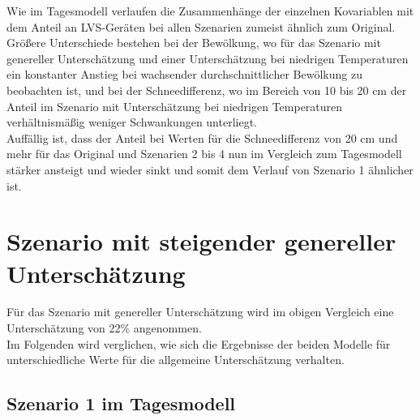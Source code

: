 \documentclass[12pt]{scrreprt}
\begin{document}
Wie im Tagesmodell verlaufen die Zusammenhänge der einzelnen Kovariablen mit dem Anteil an LVS-Geräten bei allen Szenarien zumeist ähnlich zum Original. Größere Unterschiede bestehen bei der Bewölkung, wo für das Szenario mit genereller Unterschätzung und einer Unterschätzung bei niedrigen Temperaturen ein konstanter Anstieg bei wachsender durchschnittlicher Bewölkung zu beobachten ist, und bei der Schneedifferenz, wo im Bereich von 10 bis 20 cm der Anteil im Szenario mit Unterschätzung bei niedrigen Temperaturen verhältnismäßig weniger Schwankungen unterliegt. \\
Auffällig ist, dass der Anteil bei Werten für die Schneedifferenz von 20 cm und mehr für das Original und Szenarien 2 bis 4 nun im Vergleich zum Tagesmodell stärker ansteigt und wieder sinkt und somit dem Verlauf von Szenario 1 ähnlicher ist.

\section{Szenario mit steigender genereller Unterschätzung}
Für das Szenario mit genereller Unterschätzung wird im obigen Vergleich eine Unterschätzung von 22\% angenommen. \\
Im Folgenden wird verglichen, wie sich die Ergebnisse der beiden Modelle für unterschiedliche Werte für die allgemeine Unterschätzung verhalten.

\subsection{Szenario 1 im Tagesmodell}
\end{document}
